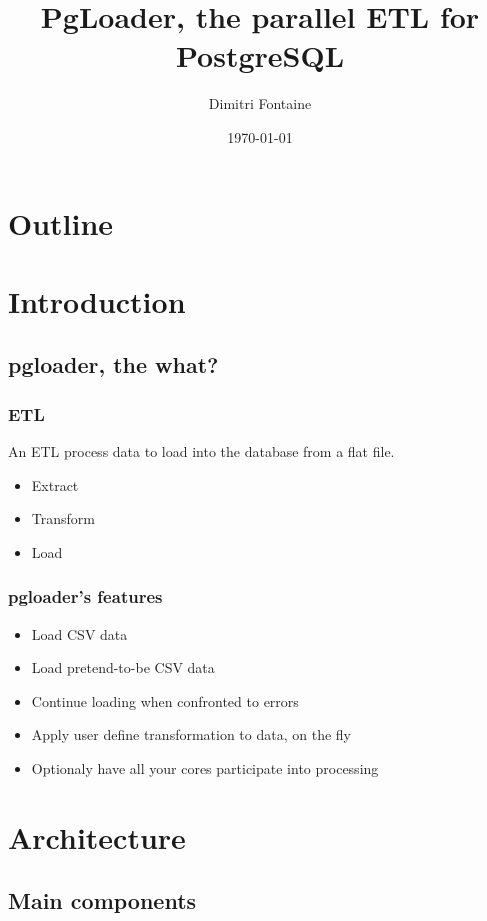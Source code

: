 \documentclass{beamer}
\title{PgLoader, the parallel ETL for PostgreSQL}
\author{Dimitri Fontaine}
\date{\today}
\begin{document}
\frame{\titlepage}

\section*{Outline}

\section{Introduction}
\subsection{pgloader, the what?}

\frame
{
  \frametitle{ETL}

  \begin{definition}
    An \alert{ETL} process data to load into the database from a flat
    file.
  \end{definition}

  \begin{itemize}
   \item<1-> Extract
   \item<2-> Transform
   \item<3-> Load
  \end{itemize}
}

\frame
{
  \frametitle{pgloader's features}

  \begin{itemize}
   \item<1-> Load CSV data
   \item<2-> Load pretend-to-be CSV data
   \item<3-> Continue loading when confronted to errors
   \item<4-> Apply user define transformation to data, on the fly
   \item<5-> Optionaly have all your cores participate into processing
  \end{itemize}
}

\section{Architecture}
\subsection{Main components}

\end{document}
